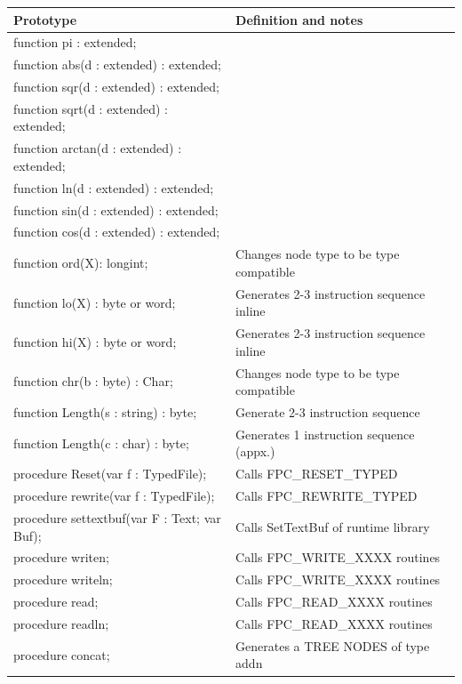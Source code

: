 \documentclass [a4paper,12pt]{article}
\begin{document}
\begin{longtable}{|l|p{7cm}|}
\hline
Prototype& Definition and notes \\
\hline
\endhead
\hline
\endfoot
\textsf{function pi : extended;}& \\
\textsf{function abs(d : extended) : extended;}& \\
\textsf{function sqr(d : extended) : extended;}& \\
\textsf{function sqrt(d : extended) : extended;}& \\
\textsf{function arctan(d : extended) : extended;}& \\
\textsf{function ln(d : extended) : extended;}& \\
\textsf{function sin(d : extended) : extended;}& \\
\textsf{function cos(d : extended) : extended;}& \\
\textsf{function ord(X): longint;}&
   Changes node type to be type compatible \\
\textsf{function lo(X) : byte or word;}&
   Generates 2-3 instruction sequence inline \\
\textsf{function hi(X) : byte or word;}&
   Generates 2-3 instruction sequence inline \\
\textsf{function chr(b : byte) : Char;}&
   Changes node type to be type compatible \\
\textsf{function Length(s : string) : byte;}&
   Generate 2-3 instruction sequence \\
\textsf{function Length(c : char) : byte;}&
   Generates 1 instruction sequence (appx.) \\
\textsf{procedure Reset(var f : TypedFile);}&
   Calls FPC{\_}RESET{\_}TYPED \\
\textsf{procedure rewrite(var f : TypedFile);}&
   Calls FPC{\_}REWRITE{\_}TYPED \\
\textsf{procedure settextbuf(var F : Text; var Buf);}&
   Calls SetTextBuf of runtime library \\
\textsf{procedure writen;}&
   Calls FPC{\_}WRITE{\_}XXXX routines \\
\textsf{procedure writeln;}&
   Calls FPC{\_}WRITE{\_}XXXX routines \\
\textsf{procedure read;}&
   Calls FPC{\_}READ{\_}XXXX routines \\
\textsf{procedure readln;}&
   Calls FPC{\_}READ{\_}XXXX routines \\
\textsf{procedure concat;}&
   Generates a TREE NODES of type addn \\

\end{longtable}
\end{document}
